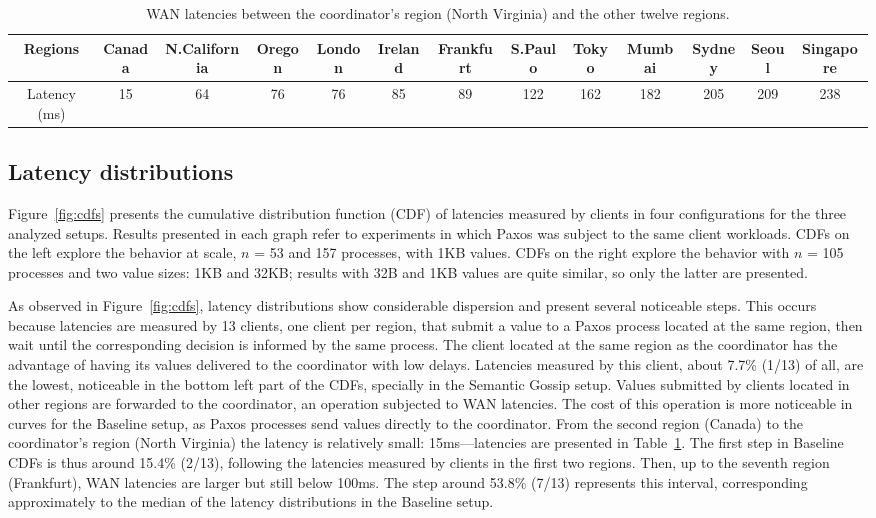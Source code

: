 \begin{table}
\begin{small}
\setlength{\tabcolsep}{3.5pt}
\begin{tabular}{c|cccccccccccc}
Regions  & Canada & N.California & Oregon & London & Ireland & Frankfurt & S.Paulo & Tokyo & Mumbai & Sydney & Seoul & Singapore \\ \hline
Latency (ms)  & 15  & 64  & 76  & 76  & 85  & 89  & 122  & 162  & 182  & 205  & 209  & 238 \\ 
\end{tabular}
\end{small}
\caption{WAN latencies between the coordinator's region (North Virginia) and the other twelve regions.}
\label{tab:wan}
\end{table}

\subsection{Latency distributions}
\label{sec:cdfs}

Figure~\ref{fig:cdfs} presents the cumulative distribution function (CDF) of
latencies measured by clients in four configurations for the three analyzed
setups.
Results presented in each graph refer to experiments in which Paxos was
subject to the same client workloads.
%
CDFs on the left explore the behavior at scale, $n$ = 53 and 157 processes,
with 1KB values.
CDFs on the right explore the behavior with $n$ = 105 processes and two value
sizes: 1KB and 32KB; results with 32B and 1KB values are quite similar, so only
the latter are presented.

As observed in Figure~\ref{fig:cdfs}, latency distributions show considerable
dispersion and present several noticeable steps.
This occurs because latencies are measured by 13 clients, one client per
region, that submit a value to a Paxos process located at the same region, then
wait until the corresponding decision is informed by the same process.
The client located at the same region as the coordinator has the advantage of
having its values delivered to the coordinator with low delays.
Latencies measured by this client, about 7.7\% (1/13) of all, are the lowest,
noticeable in the bottom left part of the CDFs, specially in the Semantic Gossip
setup.
Values submitted by clients located in other regions are forwarded to the
coordinator, an operation subjected to WAN latencies.
The cost of this operation is more noticeable in curves for the Baseline setup,
as Paxos processes send values directly to the coordinator.
%
From the second region (Canada) to the coordinator's region (North Virginia)
the latency is relatively small: 15ms---latencies are presented in
Table~\ref{tab:wan}.
The first step in Baseline CDFs is thus around 15.4\% (2/13), following the
latencies measured by clients in the first two regions.
Then, up to the seventh region (Frankfurt), WAN latencies are larger but still
below 100ms.
The step around 53.8\% (7/13) represents this interval, corresponding
approximately to the median of the latency distributions in the Baseline setup.

